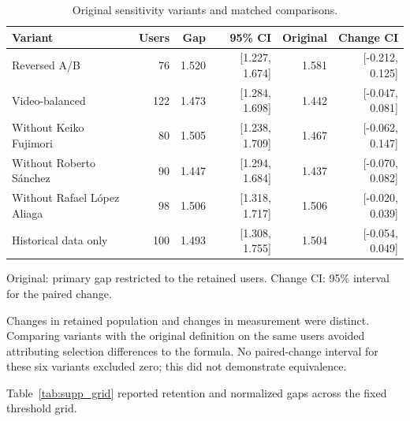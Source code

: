 \documentclass[11pt,a4paper]{article}
\begin{document}
\begin{table}[H]\centering\small
\caption{Original sensitivity variants and matched comparisons.}
\label{tab:supp_sensitivity}
\setlength{\tabcolsep}{4pt}
\begin{tabular}{lrrrrr}\toprule
Variant & Users & Gap & 95\% CI & Original & Change CI\\\midrule
Reversed A/B & 76 & 1.520 & [1.227, 1.674] & 1.581 & [-0.212, 0.125]\\
Video-balanced & 122 & 1.473 & [1.284, 1.698] & 1.442 & [-0.047, 0.081]\\
Without Keiko Fujimori & 80 & 1.505 & [1.238, 1.709] & 1.467 & [-0.062, 0.147]\\
Without Roberto Sánchez & 90 & 1.447 & [1.294, 1.684] & 1.437 & [-0.070, 0.082]\\
Without Rafael López Aliaga & 98 & 1.506 & [1.318, 1.717] & 1.506 & [-0.020, 0.039]\\
Historical data only & 100 & 1.493 & [1.308, 1.755] & 1.504 & [-0.054, 0.049]\\
\bottomrule\end{tabular}
\par\smallskip\footnotesize Original: primary gap restricted to the retained users. Change CI: 95\% interval for the paired change.
\end{table}

Changes in retained population and changes in measurement were distinct. Comparing variants with the original definition on the same users avoided attributing selection differences to the formula. No paired-change interval for these six variants excluded zero; this did not demonstrate equivalence.

Table~\ref{tab:supp_grid} reported retention and normalized gaps across the fixed threshold grid.
\end{document}
